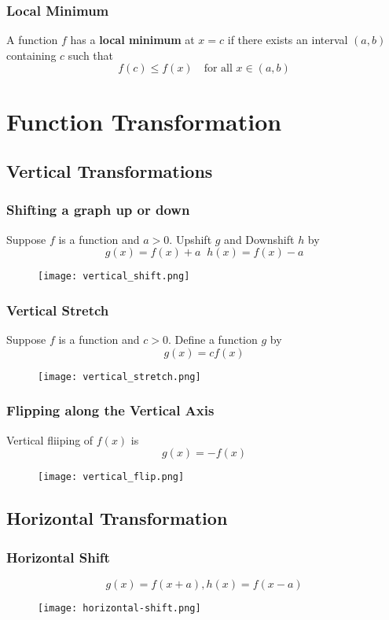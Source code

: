 \subsubsection{Local Minimum}
A function \(f\) has a \textbf{local minimum} at \(x = c\) if there exists an interval \((a, b)\) containing \(c\) such that
\[ f(c) \leq f(x) \quad \text{for all } x \in (a, b) \]

\section{Function Transformation}
\subsection{Vertical Transformations}
\subsubsection{Shifting a graph up or down}
Suppose \(f \) is a function and \(a > 0\). Upshift \(g\) and  Downshift \(h\) by
\[g(x) = f (x) + a \;\; h(x) = f (x) - a \]
\begin{figure}[h]
  \centering
  \texttt{[image: vertical\_shift.png]}
\end{figure}

\subsubsection{Vertical Stretch}
Suppose \(f\) is a function and \(c > 0\). Define a function \(g\) by
\[g(x) = c f (x)\]
\begin{figure}[h]
  \centering
  \texttt{[image: vertical\_stretch.png]}
\end{figure}

\subsubsection{Flipping along the Vertical Axis}
Vertical fliiping of \(f(x) \) is
\[g(x) = - f (x) \]
\begin{figure}[h]
  \centering
  \texttt{[image: vertical\_flip.png]}
\end{figure}

\subsection{Horizontal Transformation}
\subsubsection{Horizontal Shift}
\[g(x) = f(x+a), h(x) = f(x-a)\]
\begin{figure}[h]
  \centering
  \texttt{[image: horizontal-shift.png]}
\end{figure}

